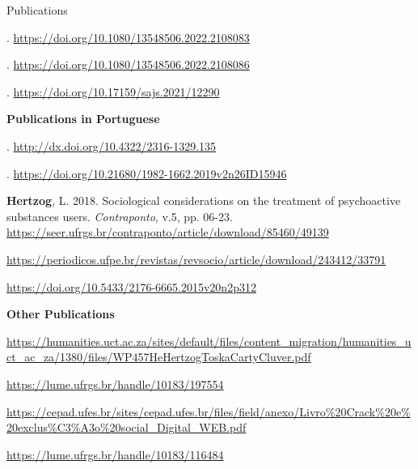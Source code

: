 \begin{rSection}{Publications}
\begin{etaremune}
\item {}. \url{https://doi.org/10.1080/13548506.2022.2108083}

\item {}. \url{https://doi.org/10.1080/13548506.2022.2108086}

\item {}. \url{https://doi.org/10.17159/sajs.2021/12290}
\end{etaremune}

\vspace{1em}
{\large \textbf {Publications in Portuguese}}
\vspace{1em}

\begin{etaremune}
\item {}. \url{http://dx.doi.org/10.4322/2316-1329.135}

\item {}. \url{https://doi.org/10.21680/1982-1662.2019v2n26ID15946 }

\item \textbf{Hertzog}, L. 2018. Sociological considerations on the treatment of psychoactive substances users. \textit{Contraponto}, v.5, pp. 06-23. \url{https://seer.ufrgs.br/contraponto/article/download/85460/49139}

\item {} \url{https://periodicos.ufpe.br/revistas/revsocio/article/download/243412/33791}

\item {} \url{https://doi.org/10.5433/2176-6665.2015v20n2p312}
\end{etaremune}

\vspace{1em}
\large \textbf {Other Publications}
\vspace{1em}

\begin{etaremune}
\item {} \url{https://humanities.uct.ac.za/sites/default/files/content_migration/humanities_uct_ac_za/1380/files/WP457HeHertzogToskaCartyCluver.pdf}

\item {} \url{https://lume.ufrgs.br/handle/10183/197554}

\item {}
\url{https://cepad.ufes.br/sites/cepad.ufes.br/files/field/anexo/Livro\%20Crack\%20e\%20exclus\%C3\%A3o\%20social_Digital_WEB.pdf}

\item {} \url{https://lume.ufrgs.br/handle/10183/116484}{\textcolor{mydoi}{\aiDoi}}

\item {}

\end{etaremune}

\end{rSection}